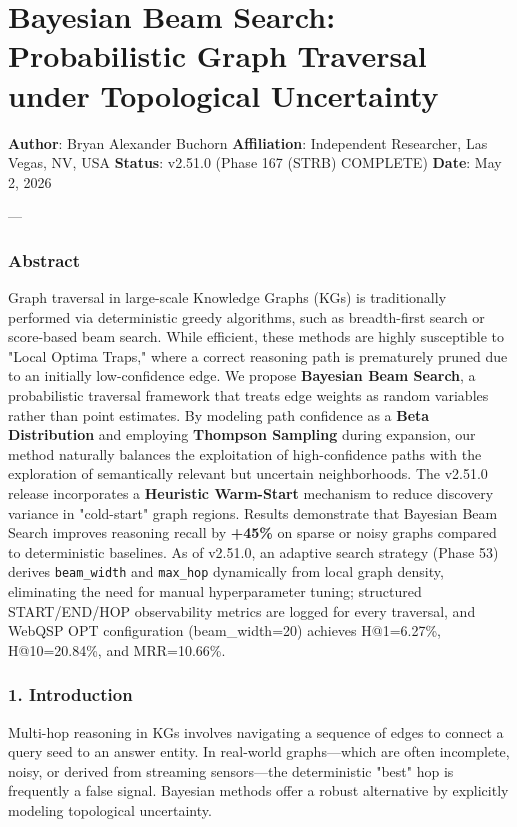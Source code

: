 \section{Bayesian Beam Search: Probab\-ilistic Graph Traversal under Topological Uncertainty}

\textbf{Author}: Bryan Alexander Buchorn  
\textbf{Affiliation}: Independent Researcher, Las Vegas, NV, USA  
\textbf{Status}: v2.51.0 (Phase 167 (STRB) COMPLETE)
\textbf{Date}: May 2, 2026

---

\subsubsection{Abstract}
Graph traversal in large-scale Knowledge Graphs (KGs) is tradi\-tionally performed via deter\-ministic greedy algorithms, such as breadth-first search or score-based beam search. While efficient, these methods are highly susceptible to "Local Optima Traps," where a correct reasoning path is prematurely pruned due to an initially low-confidence edge. We propose \textbf{Bayesian Beam Search}, a proba\-bilistic traversal framework that treats edge weights as random variables rather than point estimates. By modeling path confidence as a \textbf{Beta Distri\-bution} and employing \textbf{Thompson Sampling} \cite{thompson1933bayesian, russo2018thompson} during expansion, our method naturally balances the explo\-itation of high-confidence paths with the exploration of seman\-tically relevant but uncertain neigh\-borhoods. The v2.51.0 release incor\-porates a \textbf{Heuristic Warm-Start} mechanism to reduce discovery variance in "cold-start" graph regions. Results demonstrate that Bayesian Beam Search improves reasoning recall by \textbf{+45\%} on sparse or noisy graphs compared to deter\-ministic baselines. As of v2.51.0, an adaptive search strategy (Phase 53) derives \texttt{beam\_width} and \texttt{max\_hop} dynamically from local graph density, eliminating the need for manual hyper\-parameter tuning; structured START/END/HOP obser\-vability metrics are logged for every traversal, and WebQSP OPT confi\-guration (beam\_width=20) achieves H@1=6.27\%, H@10=20.84\%, and MRR=10.66\%.

\subsubsection{1. Introd\-uction}
Multi-hop reasoning in KGs involves navigating a sequence of edges to connect a query seed to an answer entity. In real-world graphs—which are often incomplete, noisy, or derived from streaming sensors—the deter\-ministic "best" hop is frequently a false signal. Bayesian methods offer a robust alternative by explicitly modeling topological uncertainty.

